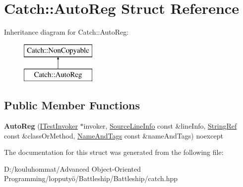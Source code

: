 \hypertarget{struct_catch_1_1_auto_reg}{}\section{Catch\+:\+:Auto\+Reg Struct Reference}
\label{struct_catch_1_1_auto_reg}
Inheritance diagram for Catch\+:\+:Auto\+Reg\+:\begin{figure}[H]
\begin{center}
\leavevmode
\includegraphics[height=2.000000cm]{struct_catch_1_1_auto_reg}
\end{center}
\end{figure}
\subsection*{Public Member Functions}
\begin{DoxyCompactItemize}
\item 
\mbox{\label{struct_catch_1_1_auto_reg_a7eba02fb9d80b9896bf5a6517369af28}} 
{\bfseries Auto\+Reg} (\mbox{\hyperlink{struct_catch_1_1_i_test_invoker}{I\+Test\+Invoker}} $\ast$invoker, \mbox{\hyperlink{struct_catch_1_1_source_line_info}{Source\+Line\+Info}} const \&line\+Info, \mbox{\hyperlink{class_catch_1_1_string_ref}{String\+Ref}} const \&class\+Or\+Method, \mbox{\hyperlink{struct_catch_1_1_name_and_tags}{Name\+And\+Tags}} const \&name\+And\+Tags) noexcept
\end{DoxyCompactItemize}


The documentation for this struct was generated from the following file\+:\begin{DoxyCompactItemize}
\item 
D\+:/kouluhommat/\+Advanced Object-\/\+Oriented Programming/lopputyö/\+Battleship/\+Battleship/catch.\+hpp\end{DoxyCompactItemize}
